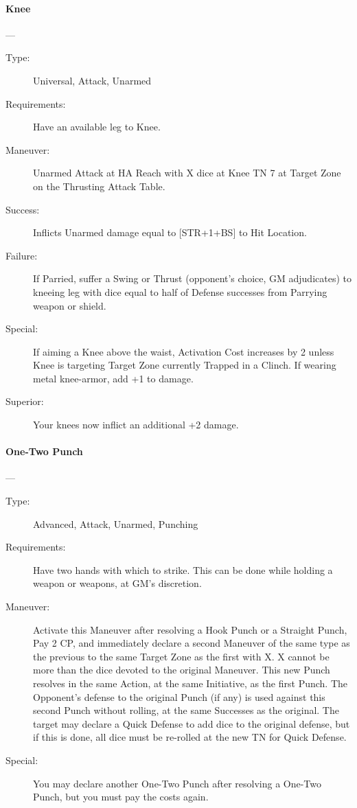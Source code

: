 \documentclass[oneside,11pt,english]{book}
\begin{document}
\paragraph{\large\label{man:Knee}Knee}---\quad{\large[X]}
\vspace{-10pt}\begin{description} 
\item [Type:] Universal, Attack, Unarmed 
\item [Requirements:] Have an available leg to Knee. 
\item [Maneuver:] Unarmed Attack at HA Reach with X dice at Knee TN 7 at Target Zone on the Thrusting 
Attack Table. 
\item [Success:] Inflicts Unarmed damage equal to [STR+1+BS] to Hit Location. 
\item [Failure:] If Parried, suffer a Swing or Thrust (opponent’s choice, GM adjudicates) to kneeing leg with 
dice equal to half of Defense successes from Parrying weapon or shield. 
\item [Special:] If aiming a Knee above the waist, Activation Cost increases by 2 unless Knee is targeting Target 
Zone currently Trapped in a Clinch. If wearing metal knee-armor, add +1 to damage. 
\item [Superior:] Your knees now inflict an additional +2 damage. 
\end{description}

\paragraph{\large\label{man:One-Two Punch}One-Two Punch}---\quad{\large[X+2]}
\vspace{-10pt}\begin{description}
\item [Type:] Advanced, Attack, Unarmed, Punching 
\item [Requirements:] Have two hands with which to strike. This can be done while holding a weapon or 
weapons, at GM’s discretion. 
\item [Maneuver:] Activate this Maneuver after resolving a Hook Punch or a Straight Punch, Pay 2 CP, and 
immediately declare a second Maneuver of the same type as the previous to the same Target Zone as the 
first with X. X cannot be more than the dice devoted to the original Maneuver. This new Punch resolves 
in the same Action, at the same Initiative, as the first Punch. The Opponent’s defense to the original 
Punch (if any) is used against this second Punch without rolling, at the same Successes as the original. 
The target may declare a Quick Defense to add dice to the original defense, but if this is done, all dice 
must be re-rolled at the new TN for Quick Defense. 
\item [Special:] You may declare another One-Two Punch after resolving a One-Two Punch, but you must pay 
the costs again. 
\end{description}
 
\end{document}
